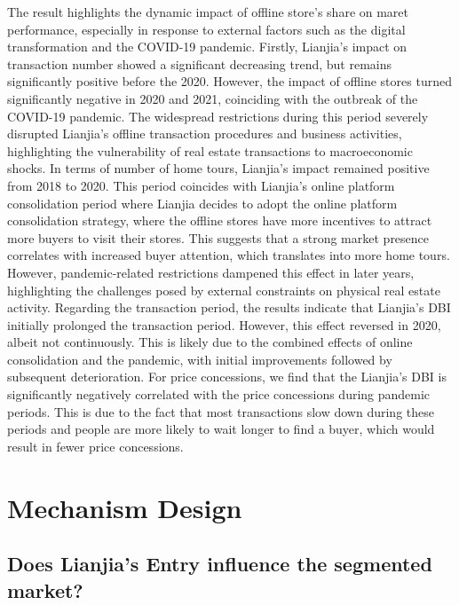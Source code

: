 \documentclass[11pt]{article}
\begin{document}
The result highlights the dynamic impact of offline store's share on maret performance, especially in response to external factors such as the digital transformation and the COVID-19 pandemic. Firstly, Lianjia's impact on transaction number showed a significant decreasing trend, but remains significantly positive before the 2020. However, the impact of offline stores turned significantly negative in 2020 and 2021, coinciding with the outbreak of the COVID-19 pandemic. The widespread restrictions during this period severely disrupted Lianjia's offline transaction procedures and business activities, highlighting the vulnerability of real estate transactions to macroeconomic shocks. In terms of number of home tours, Lianjia's impact remained positive from 2018 to 2020. This period coincides with Lianjia's online platform consolidation period where Lianjia decides to adopt the online platform consolidation strategy, where the offline stores have more incentives to attract more buyers to visit their stores. This suggests that a strong market presence correlates with increased buyer attention, which translates into more home tours. However, pandemic-related restrictions dampened this effect in later years, highlighting the challenges posed by external constraints on physical real estate activity. Regarding the transaction period, the results indicate that Lianjia's DBI initially prolonged the transaction period. However, this effect reversed in 2020, albeit not continuously. This is likely due to the combined effects of online consolidation and the pandemic, with initial improvements followed by subsequent deterioration. For price concessions, we find that the Lianjia's DBI is significantly negatively correlated with the price concessions during pandemic periods. This is due to the fact that most transactions slow down during these periods and people are more likely to wait longer to find a buyer, which would result in fewer price concessions.

\section{Mechanism Design} \label{sec:mechanism_design}

\subsection{Does Lianjia's Entry influence the segmented market?} \label{subsec:entry_effect}
\end{document}
